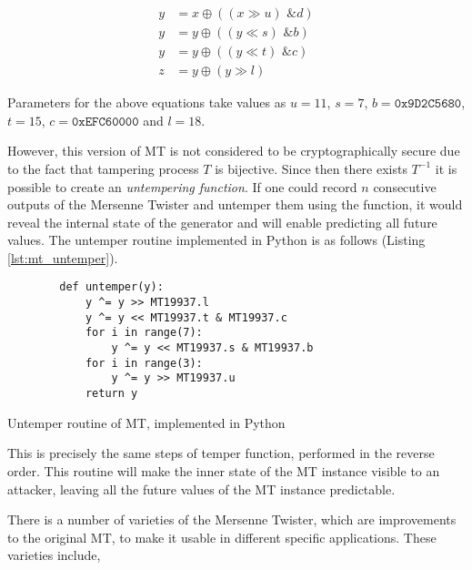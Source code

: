 \begin{align*}
    y &= x \oplus ((x \gg u) \text{ \& } d) \\
    y &= y \oplus ((y \ll s) \text{ \& } b) \\
    y &= y \oplus ((y \ll t) \text{ \& } c) \\
    z &= y \oplus (y \gg l)
\end{align*}

Parameters for the above equations take values as $u = 11$, $s = 7$, $b = \mathtt{0x9D2C5680}$, $t = 15$, $c = \mathtt{0xEFC60000}$ and $l = 18$\cite{art_mt_tomacs_urng}.

However, this version of MT is not considered to be cryptographically secure due to the fact that tampering process $T$ is bijective. Since then there exists $T^{-1}$ it is possible to create an \textit{untempering function}. If one could record $n$ consecutive outputs of the Mersenne Twister and untemper them using the function, it would reveal the internal state of the generator and will enable predicting all future values. The untemper routine implemented in Python is as follows (Listing \ref{lst:mt_untemper}).

\begin{code}
    \begin{verbatim}
        def untemper(y):
            y ^= y >> MT19937.l
            y ^= y << MT19937.t & MT19937.c
            for i in range(7):
                y ^= y << MT19937.s & MT19937.b
            for i in range(3):
                y ^= y >> MT19937.u
            return y
    \end{verbatim}
    \caption{Untemper routine of MT, implemented in Python}
    \label{lst:mt_untemper}
\end{code}

This is precisely the same steps of temper function, performed in the reverse order. This routine will make the inner state of the MT instance visible to an attacker, leaving all the future values of the MT instance predictable.

There is a number of varieties of the Mersenne Twister, which are improvements to the original MT, to make it usable in different specific applications. These varieties include,

